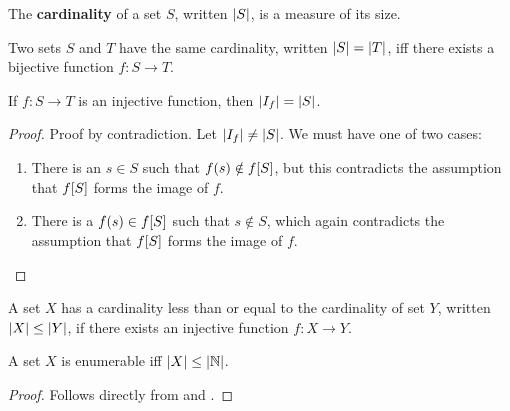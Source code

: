 \begin{notion} The \textbf{cardinality} of a set $S$, written $\mathopen{}\left|{S}\right|\mathclose{}$, is a
measure of its size. \end{notion}

\begin{definition} \label{def:same-card} Two sets $S$ and $T$ have the same
cardinality, written $\mathopen{}\left|{S}\right|\mathclose{}=\mathopen{}\left|{T}\right|\mathclose{}$, iff there exists a bijective function
$f : S\rightarrow T$.\end{definition}

\begin{theorem} \label{thm:injective-image-card} If $f : S \rightarrow T$ is an
injective function, then $\mathopen{}\left|{I_f}\right|\mathclose{}=\mathopen{}\left|{S}\right|\mathclose{}$. \end{theorem}

\begin{proof} Proof by contradiction. Let $\mathopen{}\left|{I_f}\right|\mathclose{} \neq \mathopen{}\left|{S}\right|\mathclose{}$. We
must have one of two cases: 

\begin{enumerate}

\item There is an $s\in S$ such that $f\mathopen{}\left({s}\right)\mathclose{}\notin f\mathopen{}\left[{S}\right]\mathclose{}$, but this
contradicts the assumption that $f\mathopen{}\left[{S}\right]\mathclose{}$ forms the image of $f$.

\item There is a $f\mathopen{}\left({s}\right)\mathclose{}\in f\mathopen{}\left[{S}\right]\mathclose{}$ such that $s\notin S$, which again
contradicts the assumption that $f\mathopen{}\left[{S}\right]\mathclose{}$ forms the image of $f$. 

\end{enumerate}

\end{proof}

\begin{definition} \label{def:card-leq} A set $X$ has a cardinality less than
or equal to the cardinality of set $Y$, written $\mathopen{}\left|{X}\right|\mathclose{}\leq\mathopen{}\left|{Y}\right|\mathclose{}$, if
there exists an injective function $f:X\rightarrow Y$. \end{definition}

\begin{theorem}\label{thm:card-enumerable} A set $X$ is enumerable iff
$\mathopen{}\left|{X}\right|\mathclose{}\leq\mathopen{}\left|{\mathbb{N}}\right|\mathclose{}$.  \end{theorem}

\begin{proof} Follows directly from  and .
\end{proof}




